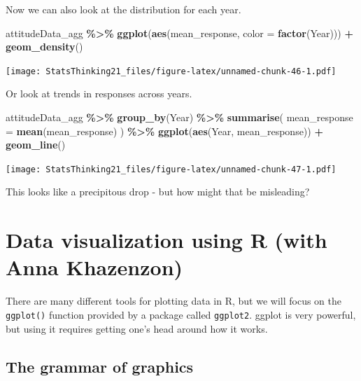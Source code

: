 \documentclass[
  12pt,
]{book}
\newenvironment{Shaded}{\begin{snugshade}}{\end{snugshade}}
\newcommand{\AttributeTok}[1]{\textcolor[rgb]{0.13,0.29,0.53}{#1}}
\newcommand{\FunctionTok}[1]{\textcolor[rgb]{0.13,0.29,0.53}{\textbf{#1}}}
\newcommand{\NormalTok}[1]{#1}
\newcommand{\SpecialCharTok}[1]{\textcolor[rgb]{0.81,0.36,0.00}{\textbf{#1}}}
\begin{document}
Now we can also look at the distribution for each year.

\begin{Shaded}
\begin{Highlighting}[]
\NormalTok{attitudeData\_agg }\SpecialCharTok{\%\textgreater{}\%} 
  \FunctionTok{ggplot}\NormalTok{(}\FunctionTok{aes}\NormalTok{(mean\_response, }\AttributeTok{color =} \FunctionTok{factor}\NormalTok{(Year))) }\SpecialCharTok{+}
  \FunctionTok{geom\_density}\NormalTok{()}
\end{Highlighting}
\end{Shaded}

\texttt{[image: StatsThinking21\_files/figure-latex/unnamed-chunk-46-1.pdf]}

Or look at trends in responses across years.

\begin{Shaded}
\begin{Highlighting}[]
\NormalTok{attitudeData\_agg }\SpecialCharTok{\%\textgreater{}\%} 
  \FunctionTok{group\_by}\NormalTok{(Year) }\SpecialCharTok{\%\textgreater{}\%} 
  \FunctionTok{summarise}\NormalTok{(}
    \AttributeTok{mean\_response =} \FunctionTok{mean}\NormalTok{(mean\_response)}
\NormalTok{  ) }\SpecialCharTok{\%\textgreater{}\%} 
  \FunctionTok{ggplot}\NormalTok{(}\FunctionTok{aes}\NormalTok{(Year, mean\_response)) }\SpecialCharTok{+}
  \FunctionTok{geom\_line}\NormalTok{()}
\end{Highlighting}
\end{Shaded}

\texttt{[image: StatsThinking21\_files/figure-latex/unnamed-chunk-47-1.pdf]}

This looks like a precipitous drop - but how might that be misleading?

\hypertarget{data-visualization}{%
\chapter{Data visualization using R (with Anna Khazenzon)}\label{data-visualization}}

There are many different tools for plotting data in R, but we will focus on the \texttt{ggplot()} function provided by a package called \texttt{ggplot2}. ggplot is very powerful, but using it requires getting one's head around how it works.

\hypertarget{the-grammar-of-graphics}{%
\section{The grammar of graphics}\label{the-grammar-of-graphics}}
\end{document}
